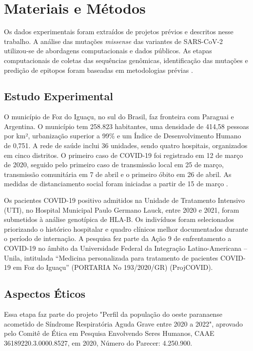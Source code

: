 \chapter{Materiais e Métodos}

\begin{justify}

\hspace{12 mm} Os dados experimentais foram extraídos de projetos prévios e descritos nesse trabalho. A análise das mutações \textit{missense} das variantes de SARS-CoV-2 utilizou-se de abordagens computacionais e dados públicos. As etapas computacionais de coletas das sequências genômicas, identificação das mutações e predição de epitopos  foram baseadas em metodologias prévias \cite{Hamelin:2022}.  


\section{Estudo Experimental}

O município de Foz do Iguaçu, no sul do Brasil, faz fronteira com Paraguai e Argentina. O município tem 258.823 habitantes, uma densidade de 414,58 pessoas por km², urbanização superior a 99\% e um Índice de Desenvolvimento Humano de 0,751. A rede de saúde inclui 36 unidades, sendo quatro hospitais, organizados em cinco distritos. O primeiro caso de COVID-19 foi registrado em 12 de março de 2020, seguido pelo primeiro caso de transmissão local em 25 de março, transmissão comunitária em 7 de abril e o primeiro óbito em 26 de abril.  As medidas de distanciamento social foram iniciadas a partir de 15 de março \cite{Viana:2021}.

Os pacientes COVID-19 positivo admitidos na Unidade de Tratamento Intensivo (UTI), no Hospital Municipal Paulo Germano Lauck, entre 2020 e 2021, foram submetidos à análise genotípica de HLA-B. Os indivíduos foram selecionados priorizando o histórico hospitalar e quadro clínicos melhor documentados durante o período de internação.  A pesquisa fez parte da  Ação 9 de enfrentamento a COVID-19 no âmbito da Universidade Federal da Integração Latino-Americana – Unila, intitulada “Medicina personalizada para tratamento de pacientes COVID-19 em Foz do Iguaçu” (PORTARIA No 193/2020/GR) (ProjCOVID).

\section{Aspectos Éticos}

Essa etapa faz parte do projeto "Perfil da população do oeste paranaense acometido de Síndrome Respiratória Aguda Grave entre 2020 a 2022", aprovado pelo Comitê de Ética em Pesquisa Envolvendo Seres Humanos, CAAE 36189220.3.0000.8527, em 2020,  Número do Parecer: 4.250.900.


\end{justify}
